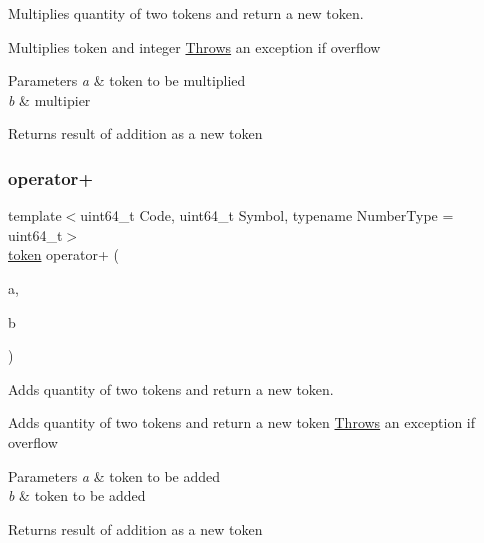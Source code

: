 Multiplies quantity of two tokens and return a new token. 

Multiplies token and integer \mbox{\hyperlink{struct_throws}{Throws}} an exception if overflow 
\begin{DoxyParams}{Parameters}
{\em a} & token to be multiplied \\
\hline
{\em b} & multipier \\
\hline
\end{DoxyParams}
\begin{DoxyReturn}{Returns}
result of addition as a new token 
\end{DoxyReturn}
\mbox{\label{classaacio_1_1token_a3a4ba798d742ab3bb7c6d16a0e823ca2}} 
\subsubsection{\texorpdfstring{operator+}{operator+}}
{\footnotesize\ttfamily template$<$uint64\+\_\+t Code, uint64\+\_\+t Symbol, typename Number\+Type  = uint64\+\_\+t$>$ \\
\mbox{\hyperlink{classaacio_1_1token}{token}} operator+ (\begin{DoxyParamCaption}\item[{const \mbox{\hyperlink{classaacio_1_1token}{token}}$<$ Code, Symbol, Number\+Type $>$ \&}]{a,  }\item[{const \mbox{\hyperlink{classaacio_1_1token}{token}}$<$ Code, Symbol, Number\+Type $>$ \&}]{b }\end{DoxyParamCaption})\hspace{0.3cm}{\ttfamily [friend]}}



Adds quantity of two tokens and return a new token. 

Adds quantity of two tokens and return a new token \mbox{\hyperlink{struct_throws}{Throws}} an exception if overflow 
\begin{DoxyParams}{Parameters}
{\em a} & token to be added \\
\hline
{\em b} & token to be added \\
\hline
\end{DoxyParams}
\begin{DoxyReturn}{Returns}
result of addition as a new token 
\end{DoxyReturn}
\mbox{\label{classaacio_1_1token_a9070e8ee2d1bf7cae8438fceb0efcb51}} 
